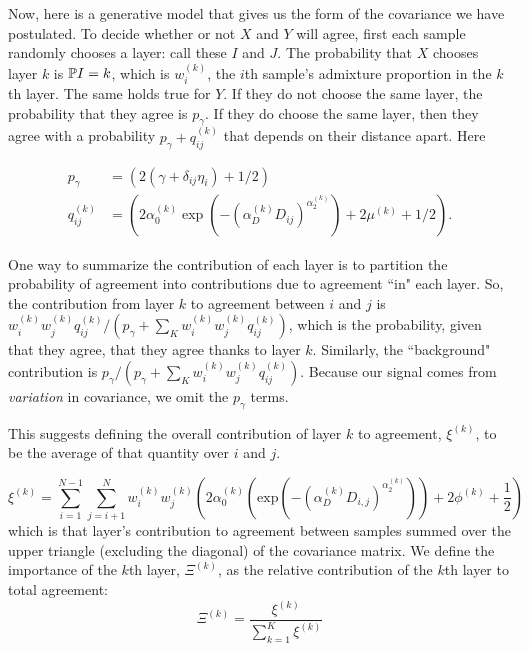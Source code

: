 \documentclass[12pt]{article}
\begin{document}
Now, here is a generative model that gives us the form of the covariance we have postulated.
To decide whether or not $X$ and $Y$ will agree,
first each sample randomly chooses a layer: call these $I$ and $J$.
The probability that $X$ chooses layer $k$ is $\P{I=k}$, which is $w_i^{(k)}$, 
the $i$th sample's admixture proportion in the $k$th layer.
The same holds true for $Y$.
If they do not choose the same layer, the probability that they agree is $p_\gamma$.
If they do choose the same layer, 
then they agree with a probability $p_\gamma + q^{(k)}_{ij}$ that depends on their distance apart.
Here

$$\begin{aligned}
    p_\gamma &= (2 (\gamma + \delta_{ij} \eta_i) + 1/2) \\
    q^{(k)}_{ij} &= \left(2 \alpha_0^{(k)} \exp\left( - \left(\alpha_D^{(k)} D_{ij}\right)^{\alpha_2^{(k)}} \right) + 2 \mu^{(k)}  + 1/2 \right) .
\end{aligned}$$

One way to summarize the contribution of each layer is to partition the probability of agreement
into contributions due to agreement ``in" each layer.
So, the contribution from layer $k$ to agreement between $i$ and $j$ is 
$w_i^{(k)} w_j^{(k)} q^{(k)}_{ij} / (p_\gamma + \sum_K w_i^{(k)} w_j^{(k)} q^{(k)}_{ij})$,
which is the probability, given that they agree, that they agree thanks to layer $k$.
Similarly, the ``background" contribution is $p_\gamma / (p_\gamma + \sum_K w_i^{(k)} w_j^{(k)} q^{(k)}_{ij})$.
Because our signal comes from \emph{variation} in covariance, we omit the $p_\gamma$ terms.

This suggests defining the overall contribution of layer $k$ to agreement, $\xi^{(k)}$, 
to be the average of that quantity over $i$ and $j$.

%
\begin{equation}
\xi^{(k)} = 
	\sum\limits_{i=1}^{N-1}
		\sum\limits_{j=i+1}^N
			w^{(k)}_iw^{(k)}_j 
				\left(	
					2\alpha^{(k)}_0 
						\left( \text{exp} 
							\left( -(\alpha^{(k)}_D D_{i,j}) ^ {\alpha^{(k)}_2}\right) 
						\right) + 2\phi^{(k)} + \frac{1}{2}
				\right)
\label{layer_contribution}
\end{equation}
%
which is that layer's contribution to agreement between samples 
summed over the upper triangle (excluding the diagonal) of the covariance matrix.
We define the importance of the $k$th layer, $\Xi^{(k)}$, 
as the relative contribution of the $k$th layer to total agreement:
%
\begin{equation}
\Xi^{(k)} = 
\frac{\xi^{(k)}}
	{\sum\limits_{k=1}^{K}
	    	\xi^{(k)}}
\label{rel_layer_contribution}
\end{equation}
%
\end{document}
